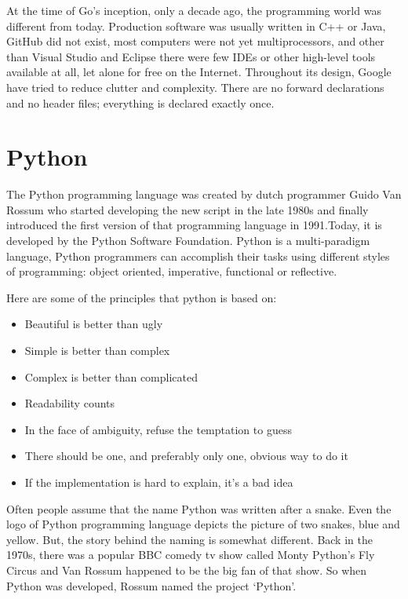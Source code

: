 At the time of Go's inception, only a decade ago, the programming world was different from today. Production software was usually written in C++ or Java, GitHub did not exist, most computers were not yet multiprocessors, and other than Visual Studio and Eclipse there were few IDEs or other high-level tools available at all, let alone for free on the Internet. Throughout its design, Google have tried to reduce clutter and complexity. There are no forward declarations and no header files; everything is declared exactly once.\newline


\section {Python}
The Python programming language was created by dutch programmer Guido Van Rossum who started developing the new script in the late 1980s and finally introduced the first version of that programming language in 1991.Today, it is developed by the Python Software Foundation. Python is a multi-paradigm language, Python programmers can accomplish their tasks using different styles of programming: object oriented, imperative, functional or reflective. \newline


Here are some of the principles that python is based on:\newline
\begin{itemize}
\item Beautiful is better than ugly
\item Simple is better than complex
\item Complex is better than complicated
\item Readability counts
\item In the face of ambiguity, refuse the temptation to guess
\item There should be one, and preferably only one, obvious way to do it
\item If the implementation is hard to explain, it’s a bad idea
\end{itemize}
Often people assume that the name Python was written after a snake. Even the logo of Python programming language depicts the picture of two snakes, blue and yellow.  But, the story behind the naming is somewhat different. Back in the 1970s, there was a popular BBC comedy tv show called Monty Python’s Fly Circus and Van Rossum happened to be the big fan of that show. So when Python was developed, Rossum named the project ‘Python’.\newline
